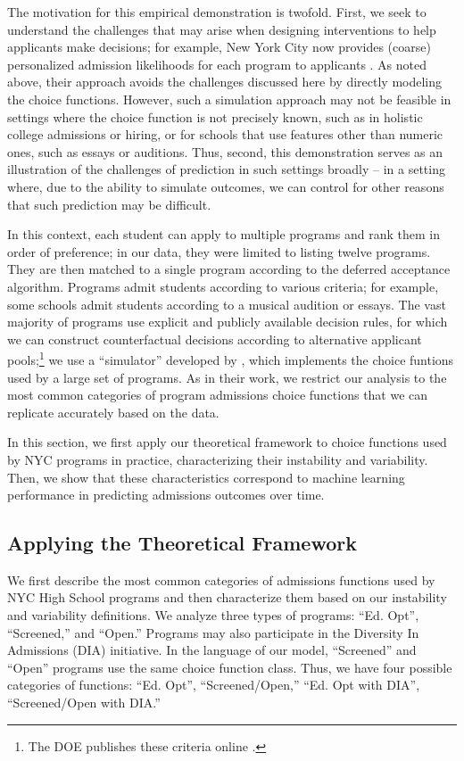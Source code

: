 \documentclass[letterpaper]{article}
\begin{document}
The motivation for this empirical demonstration is twofold. First, we seek to understand the challenges that may arise when designing interventions to help applicants make decisions; for example, New York City now provides (coarse) personalized admission likelihoods for each program to applicants \cite{ShenBerro2024HighSchoolAdmissions}. As noted above, their approach avoids the challenges discussed here by directly modeling the choice functions. However, such a simulation approach may not be feasible in settings where the choice function is not precisely known, such as in holistic college admissions or hiring, or for schools that use features other than numeric ones, such as essays or auditions. Thus, second, this demonstration serves as an illustration of the challenges of prediction in such settings broadly -- in a setting where, due to the ability to simulate outcomes, we can control for other reasons that such prediction may be difficult.

In this context, each student can apply to multiple programs and rank them in order of preference; in our data, they were limited to listing twelve programs. They are then matched to a single program according to the deferred acceptance algorithm. Programs admit students according to various criteria; for example, some schools admit students according to a musical audition or essays. The vast majority of programs use explicit and publicly available decision rules, for which we can construct counterfactual decisions according to alternative applicant pools;\footnote{The DOE publishes these criteria online \citep{nycdoe2022hsdata}.} we use a ``simulator'' developed by \citet{peng2025undermatching}, which implements the choice funtions used by a large set of programs. As in their work, we restrict our analysis to the most common categories of program admissions choice functions  that we can replicate accurately based on the data.

In this section, we first apply our theoretical framework to choice functions used by NYC programs in practice, characterizing their instability and variability. Then, we show that these characteristics correspond to machine learning performance in predicting admissions outcomes over time.

\subsection{Applying the Theoretical Framework}

We first describe the most common categories of admissions functions used by NYC High School programs and then characterize them based on our instability and variability definitions. We analyze three types of programs: ``Ed. Opt'', ``Screened,'' and ``Open.'' Programs may also participate in the Diversity In Admissions (DIA) initiative. In the language of our model, ``Screened'' and ``Open'' programs use the same choice function class. Thus, we have four possible categories of functions: ``Ed. Opt'', ``Screened/Open,'' ``Ed. Opt with DIA'', ``Screened/Open with DIA.''
\end{document}
